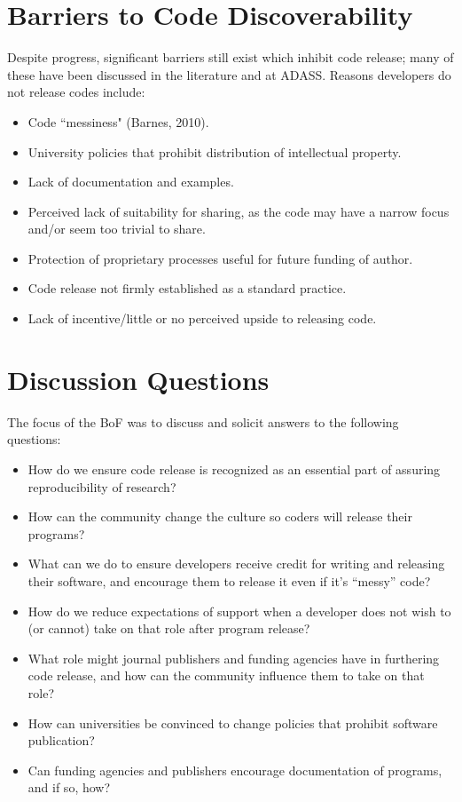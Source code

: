 \documentclass[11pt,twoside]{article}
\begin{document}
\section{Barriers to Code Discoverability}

Despite progress, significant barriers still exist which inhibit code release; many of these have been discussed in the literature and at ADASS. Reasons developers do not release codes include:

\begin{itemize}
\item Code ``messiness" (Barnes, 2010).
\item University policies that prohibit distribution of intellectual property.
\item Lack of documentation and examples.
\item Perceived lack of suitability for sharing, as the code may have a narrow focus and/or seem too trivial to share.
\item Protection of proprietary processes useful for future funding of author.
\item Code release not firmly established as a standard practice.
\item Lack of incentive/little or no perceived upside to releasing code.
\end{itemize}

\section{Discussion Questions}

The focus of the BoF was to discuss and solicit answers to the following questions:

\begin{itemize}
\item How do we ensure code release is recognized as an essential part of assuring reproducibility of research?
\item How can the community change the culture so coders will release their programs?
\item What can we do to ensure developers receive credit for writing and releasing their software, and encourage them to release it even if it's ``messy'' code?
\item How do we reduce expectations of support when a developer does not wish to (or cannot) take on that role after program release?
\item What role might journal publishers and funding agencies have in furthering code release, and how can the community influence them to take on that role?
\item How can universities be convinced to change policies that prohibit software publication?
\item Can funding agencies and publishers encourage documentation of programs, and if so, how?
\end{itemize}
\end{document}
